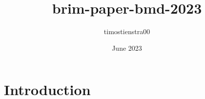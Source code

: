 \documentclass{article}
\title{brim-paper-bmd-2023}
\author{timostienstra00 }
\date{June 2023}
\begin{document}
\maketitle

\section{Introduction}
\end{document}
